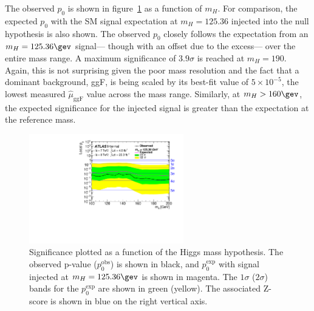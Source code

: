 The observed $p_0$ is shown in
figure~\ref{chap:statistics:fig:signif_mH_injection_fullfit} as a
function of $m_H$. For comparison, the expected $p_0$ with the SM
signal expectation at $m_H = 125.36$ injected into the null hypothesis
is also shown. The observed
$p_0$ closely follows the expectation from an $m_H = 125.36 \gev$
signal--- though with an offset due to the excess--- over the entire
mass range. A maximum significance of $3.9\sigma$ is reached at $m_H =
190$. Again,
this is not surprising given the poor mass resolution and the fact
that a dominant background, ggF, is being scaled by its best-fit
value of $5 \times 10^{-5}$, the lowest measured
$\hat{\mu}_{\textrm{ggF}}$ value across the mass range. Similarly, at
$m_H > 160 \gev$, the expected significance for the injected signal is
greater than the expectation at the reference mass. 

\begin{figure}
\centering
\includegraphics[width=0.6\textwidth]{fig/statistics/signif_plot/significance_mH_injection_ggF_profiled.pdf}
\caption{Significance plotted as a function of the Higgs mass
hypothesis. The observed p-value ($p_0^{\textrm{obs}}$) is shown in
black, and $p_0^{\textrm{exp}}$ with signal injected at $m_H =
125.36 \gev$ is shown in magenta. The $1\sigma$ ($2\sigma$) bands for
the $p_0^{\textrm{exp}}$ are shown in green (yellow). The associated
Z-score is shown in blue on the right vertical axis.}
\label{chap:statistics:fig:signif_mH_injection_fullfit}
\end{figure}
